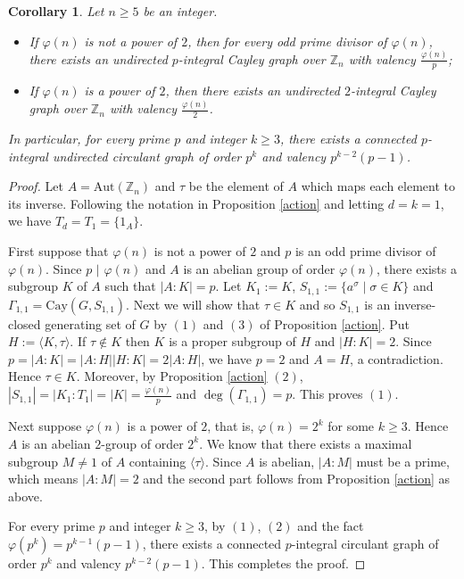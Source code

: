 \documentclass[12pt,a4paper]{article}
\newtheorem{core}[thm]{Corollary}
\def \geq {\geqslant}
\def\div{\,\,\big|\,\,} \def\ddiv{\,\,\big\Vert\,\,}\def\notdiv{{\,\,\not\big|\,\,}}
\begin{document}
	
	\begin{core}\label{p}
		Let $n\geq 5$ be an integer.
		\begin{itemize}
			\item[$(1)$] If $\varphi(n)$ is not a power of $2$, then for every odd prime divisor of $\varphi(n)$, there exists an undirected $p$-integral Cayley graph over $\mathbb Z_n$ with valency $\frac{\varphi(n)}{p}$;
			\item[$(2)$] If $\varphi(n)$ is a power of $2$, then there exists an undirected $2$-integral Cayley graph over $\mathbb Z_n$ with valency $\frac{\varphi(n)}{2}$.
		\end{itemize}
		In particular, for every prime $p$ and integer $k\geq 3$, there exists a connected $p$-integral undirected circulant graph of order $p^k$ and valency $p^{k-2}(p-1)$.
	\end{core}
	\begin{proof}
		Let $A=\mathrm{Aut}(\mathbb Z_n)$ and $\tau$ be the element of $A$ which maps each element to its inverse. 
		Following the notation in Proposition \ref{action} and letting $d=k=1$, we have
		$T_d=T_1=\{1_A\}$.
		
		First suppose that $\varphi(n)$ is not a power of $2$ and $p$ is an odd prime divisor of $\varphi(n)$.
		Since $p\div\varphi(n)$ and $A$ is an abelian group of order $\varphi(n)$, there exists a subgroup $K$ of $A$ such that $|A:K|=p$. 
		Let $K_{1}:=K$, $S_{1,1}:=\{a^\sigma\mid \sigma\in K\}$ and $\Gamma_{1,1}=\mathrm{Cay}(G,S_{1,1})$. 
		Next we will show that $\tau\in K$ and so $S_{1,1}$ is an inverse-closed generating set of $G$ by $(1)$ and $(3)$ of Proposition \ref{action}.
		Put $H:=\langle K,\tau\rangle$.
		If $\tau\notin K$ then $K$ is a proper subgroup of $H$ and $|H:K|=2$.
		Since $p=|A:K|=|A:H||H:K|=2|A:H|$, we have $p=2$ and $A=H$, a contradiction.
		Hence $\tau\in K$.
		Moreover, by Proposition \ref{action} $(2)$, $|S_{1,1}|=|K_1:T_1|=|K|=\frac{\varphi(n)}{p}$ and $\deg(\Gamma_{1,1})=p$. This proves $(1)$.
		
		Next suppose $\varphi(n)$ is a power of $2$, that is, $\varphi(n)=2^k$ for some $k\geq 3$.
		Hence $A$ is an abelian $2$-group of order $2^k$. We know that there exists a maximal subgroup $M\neq 1$ of $A$ containing $\langle \tau\rangle$. Since $A$ is abelian, $|A:M|$ must be a prime, which means $|A:M|=2$ and the second part follows from Proposition \ref{action} as above. 
		
		For every prime $p$ and integer $k\geq 3$, by $(1)$, $(2)$ and the fact $\varphi(p^k)=p^{k-1}(p-1)$, there exists a connected $p$-integral circulant graph of order $p^k$ and valency $p^{k-2}(p-1)$. This completes the proof.
	\end{proof}
	
\end{document}
